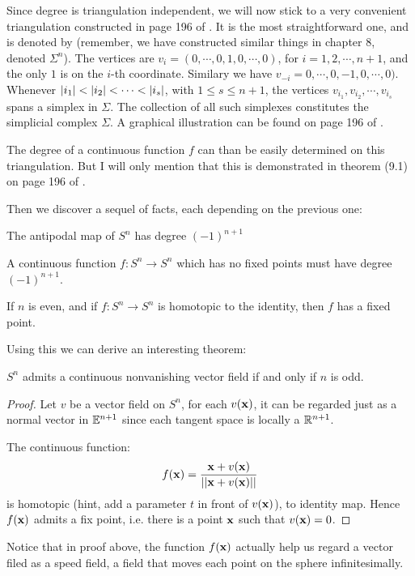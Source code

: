 Since degree is triangulation independent, we will now stick to a very
convenient triangulation constructed in page 196 of \cite{book}. It is
the most straightforward one, and is denoted by \nomen{$\Sigma$}
(remember, we have constructed similar things in chapter 8, denoted
$\Sigma^n$). The vertices are $v_i=(0,\cdots,0,1,0,\cdots,0)$, for
$i=1,2,\cdots,n+1$, and the only $1$ is on the $i$-th coordinate.
Similary we have $v_{-i}=0,\cdots,0,-1,0,\cdots,0)$. Whenever
$\abs{i_1}<\abs{i_2}<\cdots<|i_s|$, with $1\leq s \leq n+1$, the
vertices $v_{i_1},v_{i_2},\cdots,v_{i_s}$ spans a simplex in $\Sigma$.
The collection of all such simplexes constitutes the simplicial
complex $\Sigma$. A graphical illustration can be found on page 196 of
\cite{book}.

The degree of a continuous function $f$ can than be easily determined
on this triangulation. But I will only mention that this is
demonstrated in theorem (9.1) on page 196 of \cite{book}.

Then we discover a sequel of facts, each depending on the previous
one:
\begin{fact}
    The antipodal map of $S^n$ has degree $(-1)^{n+1}$
\end{fact}
\begin{fact}
    A continuous function $f:S^n\to S^n$ which has no fixed points
    must have degree $(-1)^{n+1}$.
\end{fact}
\begin{fact}
    If $n$ is even, and if $f:S^n\to S^n$ is homotopic to the
    identity, then $f$ has a fixed point.
\end{fact}

Using this we can derive an interesting theorem:
\begin{thm}
    $S^n$ admits a continuous nonvanishing vector field if and only if
    $n$ is odd.
\end{thm}
\begin{proof}
    Let $v$ be a vector field on $S^n$, for each $v(\vb{x})$, it can
    be regarded just as a normal vector in $\mathbb{E}^{n+1}$ since each
    tangent space is locally a $\mathbb{R}^{n+1}$.

    The continuous function:
    $$f(\vb{x}) = \frac{\vb{x}+v(\vb{x})}{||\vb{x}+v(\vb{x})||}$$
    is homotopic (hint, add a parameter $t$ in front of $v(\vb{x})$), 
    to identity map. Hence $f(\vb{x})$ admits a fix point, i.e. there
    is a point $\vb{x}$ such that $v(\vb{x})=0$.
\end{proof}

Notice that in proof above, the function $f(\vb{x})$ actually help us
regard a vector filed as a speed field, a field that moves each point
on the sphere infinitesimally.

